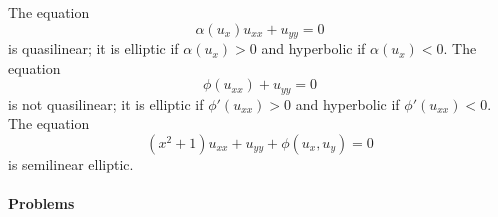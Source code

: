 \begin{Example}
\label{ex:nonlinear-classification}
The equation
\begin{equation}\label{eq:quasilinear-type-example}
\alpha(u_x)u_{xx}+u_{yy}=0
\end{equation}
is quasilinear; it is elliptic if $\alpha(u_x)>0$ and hyperbolic if $\alpha(u_x)<0$. The equation
\begin{equation}\label{eq:nonquasilinear-type-example}
\phi(u_{xx})+u_{yy}=0
\end{equation}
is not quasilinear; it is elliptic if $\phi'(u_{xx})>0$ and hyperbolic if $\phi'(u_{xx})<0$. The equation
\begin{equation}\label{eq:semilinear-elliptic-example}
(x^2+1)u_{xx}+u_{yy}+\phi(u_x,u_y)=0
\end{equation}
is semilinear elliptic.
\end{Example}

\paragraph*{Problems}

